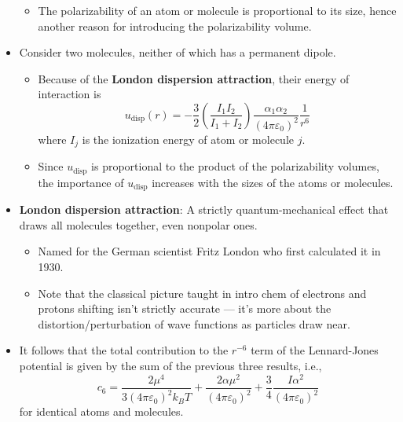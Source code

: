 \documentclass[../notes.tex]{subfiles}
\begin{document}
\begin{itemize}
    \begin{itemize}
        \item The polarizability of an atom or molecule is proportional to its size, hence another reason for introducing the polarizability volume.
    \end{itemize}
    \item Consider two molecules, neither of which has a permanent dipole.
    \begin{itemize}
        \item Because of the \textbf{London dispersion attraction}, their energy of interaction is
        \begin{equation*}
            u_\text{disp}(r) = -\frac{3}{2}\left( \frac{I_1I_2}{I_1+I_2} \right)\frac{\alpha_1\alpha_2}{(4\pi\varepsilon_0)^2}\frac{1}{r^6}
        \end{equation*}
        where $I_j$ is the ionization energy of atom or molecule $j$.
        \item Since $u_\text{disp}$ is proportional to the product of the polarizability volumes, the importance of $u_\text{disp}$ increases with the sizes of the atoms or molecules.
    \end{itemize}
    \item \textbf{London dispersion attraction}: A strictly quantum-mechanical effect that draws all molecules together, even nonpolar ones.
    \begin{itemize}
        \item Named for the German scientist Fritz London who first calculated it in 1930.
        \item Note that the classical picture taught in intro chem of electrons and protons shifting isn't strictly accurate --- it's more about the distortion/perturbation of wave functions as particles draw near.
    \end{itemize}
    \item It follows that the total contribution to the $r^{-6}$ term of the Lennard-Jones potential is given by the sum of the previous three results, i.e.,
    \begin{equation*}
        c_6 = \frac{2\mu^4}{3(4\pi\varepsilon_0)^2k_BT}+\frac{2\alpha\mu^2}{(4\pi\varepsilon_0)^2}+\frac{3}{4}\frac{I\alpha^2}{(4\pi\varepsilon_0)^2}
    \end{equation*}
    for identical atoms and molecules.
\end{itemize}
\end{document}
